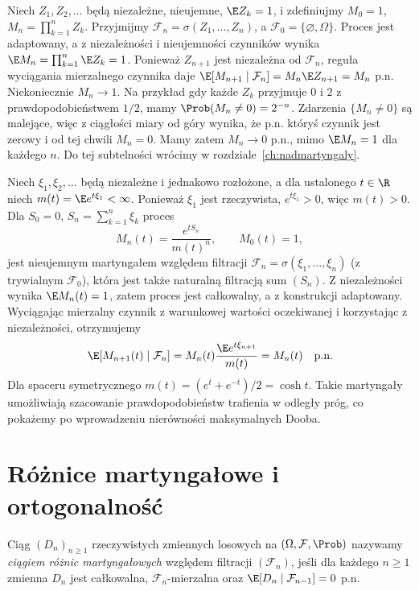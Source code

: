 \begin{przyklad}
Niech $Z_1,Z_2,\ldots$ będą niezależne, nieujemne,
$\E Z_k=1$, i zdefiniujmy $M_0=1$,
$M_n=\prod_{k=1}^n Z_k$.
Przyjmijmy $\mathcal F_n=\sigma(Z_1,\ldots,Z_n)$,
a $\mathcal F_0=\{\varnothing,\Omega\}$.
Proces jest adaptowany, a z niezależności
i nieujemności czynników wynika
$\E M_n=\prod_{k=1}^n\E Z_k=1$.
Ponieważ $Z_{n+1}$ jest niezależna od $\mathcal F_n$,
reguła wyciągania mierzalnego czynnika daje
$\E[M_{n+1}\mid\mathcal F_n]
=M_n\E Z_{n+1}=M_n$ p.n.
Niekoniecznie $M_n\to1$. Na przykład gdy
każde $Z_k$ przyjmuje $0$ i $2$ z prawdopodobieństwem
$1/2$, mamy $\Prob(M_n\ne0)=2^{-n}$.
Zdarzenia $\{M_n\ne0\}$ są malejące, więc
z ciągłości miary od góry wynika, że p.n.
któryś czynnik jest zerowy i od tej chwili
$M_n=0$. Mamy zatem $M_n\to0$ p.n.,
mimo $\E M_n=1$ dla każdego $n$. Do tej
subtelności wrócimy w rozdziale~\ref{ch:nadmartyngaly}.
\end{przyklad}

\begin{przyklad}
Niech $\xi_1,\xi_2,\ldots$ będą niezależne i jednakowo
rozłożone, a dla ustalonego $t\in\R$
niech $m(t)=\E e^{t\xi_1}<\infty$.
Ponieważ $\xi_1$ jest rzeczywista, $e^{t\xi_1}>0$,
więc $m(t)>0$. Dla $S_0=0$,
$S_n=\sum_{k=1}^n\xi_k$ proces
\[
M_n(t)=\frac{e^{tS_n}}{m(t)^n},\qquad M_0(t)=1,
\]
jest nieujemnym martyngałem względem filtracji
$\mathcal F_n=\sigma(\xi_1,\ldots,\xi_n)$
(z trywialnym $\mathcal F_0$), która jest także
naturalną filtracją sum $(S_n)$.
Z niezależności wynika $\E M_n(t)=1$, zatem
proces jest całkowalny, a z konstrukcji adaptowany.
Wyciągając mierzalny czynnik z warunkowej
wartości oczekiwanej i korzystając z niezależności,
otrzymujemy
\[
\E[M_{n+1}(t)\mid\mathcal F_n]
=M_n(t)\frac{\E e^{t\xi_{n+1}}}{m(t)}
=M_n(t)\quad\text{p.n.}
\]
Dla spaceru symetrycznego
$m(t)=(e^t+e^{-t})/2=\cosh t$.
Takie martyngały umożliwiają szacowanie
prawdopodobieństw trafienia w odległy próg,
co pokażemy po wprowadzeniu nierówności
maksymalnych Dooba.
\end{przyklad}

\section{Różnice martyngałowe i ortogonalność}

\begin{definicja}
Ciąg $(D_n)_{n\geq1}$ rzeczywistych zmiennych
losowych na $(\Omega,\mathcal F,\Prob)$ nazywamy
\emph{ciągiem różnic martyngałowych} względem
filtracji $(\mathcal F_n)$, jeśli dla każdego $n\geq1$
zmienna $D_n$ jest całkowalna, $\mathcal F_n$-mierzalna
oraz $\E[D_n\mid\mathcal F_{n-1}]=0$ p.n.
\end{definicja}

